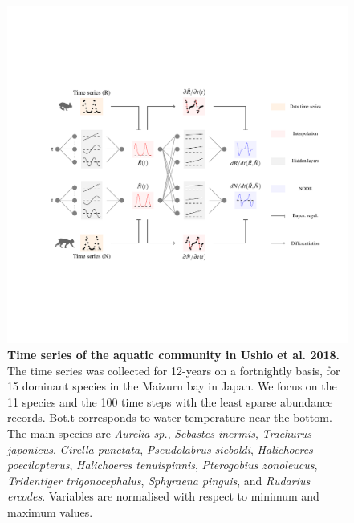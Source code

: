 \documentclass[11pt, oneside]{article}
\begin{document}
\begin{figure}[H]
\includegraphics[width=1\linewidth,page=26]{figures/main.pdf}
\caption{
    \textbf{Time series of the aquatic community in Ushio et al. 2018.}
    The time series was collected for 12-years on a fortnightly basis, for 15 dominant species in the Maizuru bay in Japan. 
    We focus on the 11 species and the 100 time steps with the least sparse abundance records. 
    Bot.t corresponds to water temperature near the bottom. 
    The main species are \textit{Aurelia sp.}, \textit{Sebastes inermis}, \textit{Trachurus japonicus}, \textit{Girella punctata}, \textit{Pseudolabrus sieboldi}, \textit{Halichoeres poecilopterus}, \textit{Halichoeres tenuispinnis}, \textit{Pterogobius zonoleucus}, \textit{Tridentiger trigonocephalus}, \textit{Sphyraena pinguis}, and \textit{Rudarius ercodes}. 
    Variables are normalised with respect to minimum and maximum values.
}
\end{figure}
\newpage
\end{document}
